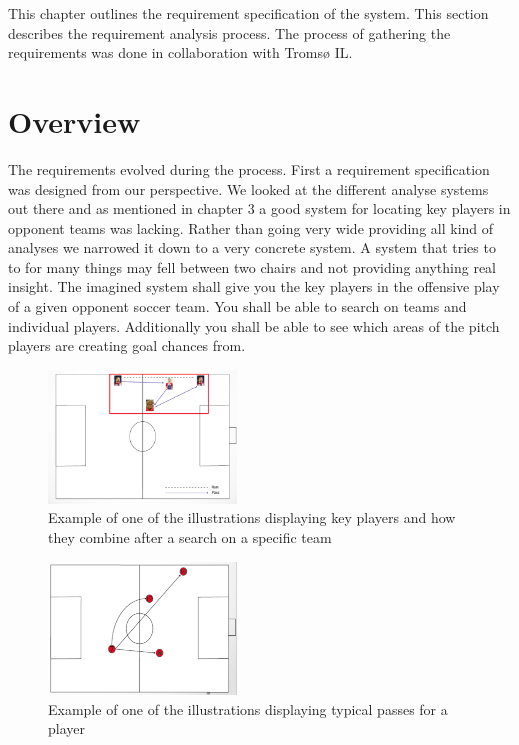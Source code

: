 This chapter outlines the requirement specification of the system. This section describes the requirement analysis process. The process of gathering the requirements was done in collaboration with Tromsø IL.

\section{Overview}

The requirements evolved during the process. First a requirement specification was designed from our perspective. We looked at the different analyse systems out there and as mentioned in chapter 3 a good system for locating key players in opponent teams was lacking. Rather than going very wide providing all kind of analyses we narrowed it down to a very concrete system. A system that tries to to for many things may fell between two chairs and not providing anything real insight. The imagined system shall give you the key players in the offensive play of a given opponent soccer team. You shall be able to search on teams and individual players. Additionally you shall be able to see which areas of the pitch players are creating goal chances from. 

\begin{figure}[ht!]
\centering
\includegraphics[width=50mm]{images/general/illustration_after_search.png}
\caption{Example of one of the illustrations displaying key players and how they combine after a search on a specific team}
\label{overflow}
\end{figure}

\begin{figure}[ht!]
\centering
\includegraphics[width=50mm]{images/general/illustration_after_search2.png}
\caption{Example of one of the illustrations displaying typical passes for a player}
\label{overflow}
\end{figure}


